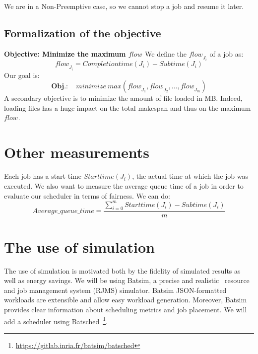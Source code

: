 \documentclass[a4paper]{article}
\newcommand{\flow}[1]{\ensuremath{\mathit{flow}_{#1}}\xspace}
\newcommand{\inputs}{\ensuremath{\mathcal{F}}\xspace}
\newcommand{\memory}{\ensuremath{\mathcal{M}}\xspace}
\newcommand{\duration}{\mathit{Duration}\xspace}
\newcommand{\bandwidth}{\mathit{BW}\xspace}
\newcommand{\core}{\mathit{Cores}\xspace}
\newcommand{\submissiontime}{\mathit{Subtime}\xspace}
\newcommand{\completiontime}{\mathit{Completiontime}\xspace}
\newcommand{\start}{\mathit{Starttime}\xspace}
\newcommand{\live}{\ensuremath{L}\xspace}
\begin{document}
We are in a Non-Preemptive case, so we cannot stop a job and resume it later.

\subsection{Formalization of the objective}
\textbf{Objective: Minimize the maximum \flow{}}
		We define the \flow{J_i} of a job as:
		$$
			\flow{J_i} = \completiontime(J_i) - \submissiontime(J_i)
		$$
		Our goal is:
		$$
			\textbf{Obj.}: \quad \mathit{minimize}~\mathit{max}(\flow{J_1}, \flow{J_2}, ..., \flow{J_m})
		$$
A secondary objective is to minimize the amount of file loaded in MB.
Indeed, loading files has a huge impact on the total makespan and thus on the maximum \flow{}.

\section{Other measurements}

Each job has a start time $\start(J_i)$, the actual time at which the job was executed.
We also want to measure the average queue time of a job in order
to evaluate our scheduler in terms of fairness. We can do:
$$
	Average\_queue\_time = \frac{\sum^{m}_{i = 0} \start(J_i) - \submissiontime(J_i)}{m}
$$


\section{The use of simulation}

The use of simulation is motivated both by the fidelity of simulated results as well as energy savings. 
We will be using Batsim, a precise and realistic~\cite{Batsim} resource and job management system (RJMS) simulator.
Batsim JSON-formatted workloads are extensible and allow easy workload generation. 
Moreover, Batsim provides clear information about scheduling metrics and job placement.
We will add a scheduler using Batsched~\footnote{\url{https://gitlab.inria.fr/batsim/batsched}}.
\end{document}
